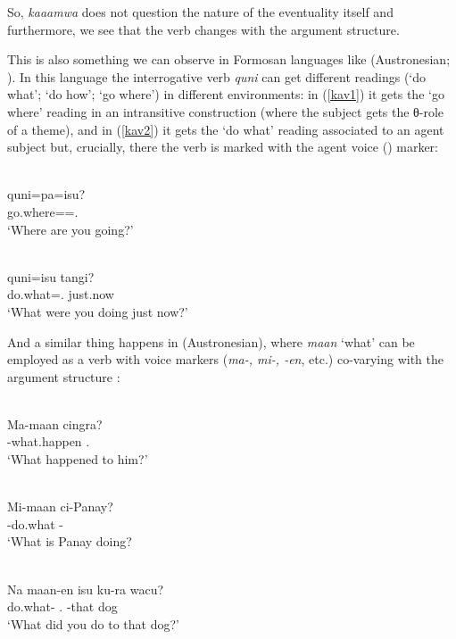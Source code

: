 \documentclass[output=paper]{langsci/langscibook}
\begin{document}
So, \emph{kaaamwa} does not question the nature of the eventuality itself and
furthermore, we see that the verb changes with the argument structure.

This is also something we can observe in Formosan languages like 
(Austronesian; \citealt[186]{lin2012}). In this language the interrogative verb
\emph{quni} can get different readings (`do what'; `do how'; `go where') in
different environments: in (\ref{kav1}) it gets the \enquote*{go where} reading in
an intransitive construction (where the subject gets the θ-role of a theme), and in (\ref{kav2}) it gets the \enquote*{do what}
reading associated to an agent subject but, crucially, there the verb is
marked with the agent voice (\Av{}) marker:

\begin{exe}
    \ex \label{kav1} \\
\gll quni=pa=isu?\\
go.where=\Fut{}=\Ssg.\Abs{}\\
\glt `Where are you going?'

\ex \label{kav2} \\
\gll quni=isu tangi?\\
\tuple{\Av}do.what=\Ssg.\Abs{} just.now\\
\glt `What were you doing just now?'
\end{exe}

And a similar thing happens in  (Austronesian), where \emph{maan} `what'
can be employed as a verb with voice markers (\emph{ma-, mi-, -en}, etc.)
co-varying with the argument structure \citep[192]{lin2012}:

\begin{exe}
\ex \label{amis1}\\
\gll Ma-maan cingra?\\
\Av{}-what.happen \Ssg.\Abs{}\\
\glt `What happened to him?'

\ex \label{amis2}\\
\gll Mi-maan ci-Panay?\\
\Av{}-do.what \Ncm{}-\Pn{}\\
\glt `What is Panay doing?

\ex \label{amis3}\\
\gll Na maan-en isu ku-ra wacu?\\
\Pst{} do.what-\Pv{} \Ssg.\Erg{} \Abs{}-that dog\\
\glt `What did you do to that dog?'
\end{exe}
\end{document}
